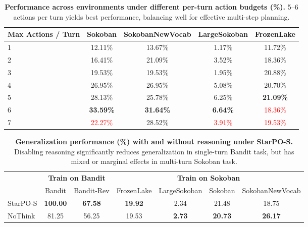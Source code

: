 \begin{table}[t]
  \centering
  \small
  \caption{\textbf{Performance across environments under different per-turn action budgets (\%).} 5--6 actions per turn yields best performance, balancing well for effective multi-step planning.}
  \begin{tabular}{lcccc}
    \toprule
    \textbf{Max Actions / Turn} & \textbf{Sokoban} & \textbf{SokobanNewVocab} & \textbf{LargeSokoban} & \textbf{FrozenLake} \\
    \midrule
    1 & 12.11\% & 13.67\% & 1.17\% & 11.72\% \\
    2 & 16.41\% & 21.09\% & 3.52\% & 18.36\% \\
    3 & 19.53\% & 19.53\% & 1.95\% & 20.88\% \\
    4 & 26.95\% & 26.95\% & 5.08\% & 20.70\% \\
    5 & 28.13\% & 25.78\% & 6.25\% & \textbf{21.09\%} \\
    6 & \textbf{33.59\%} & \textbf{31.64\%} & \textbf{6.64\%} & \textcolor{red}{18.36\%} \\
    7 & \textcolor{red}{22.27\%} & 28.52\% & \textcolor{red}{3.91\%} & \textcolor{red}{19.53\%} \\
    \bottomrule
  \end{tabular}
  \label{tab:granularity}
\vspace{-10pt}
\end{table}






\begin{table}[t]
  \centering
  \small
  \caption{\textbf{Generalization performance (\%) with and without reasoning under StarPO-S.} Disabling reasoning significantly reduces generalization in single-turn Bandit task, but has mixed or marginal effects in multi-turn Sokoban task.}
  \begin{tabular}{lcc|cccc}
    \toprule
    & \multicolumn{2}{c|}{\textbf{Train on Bandit}} & \multicolumn{4}{c}{\textbf{Train on Sokoban}} \\
    \cmidrule(r){2-3} \cmidrule(l){4-7}
    & Bandit & Bandit-Rev & FrozenLake & LargeSokoban & Sokoban & SokobanNewVocab \\
    \midrule
    StarPO-S & \textbf{100.00} & \textbf{67.58} & \textbf{19.92} & 2.34 & 21.48 & 18.75 \\
    NoThink & 81.25 & 56.25 & 19.53 & \textbf{2.73} & \textbf{20.73} & \textbf{26.17} \\
    \bottomrule
  \end{tabular}
\label{tab:reasoning_generalization_grouped}
\vspace{-8pt}
\end{table}



